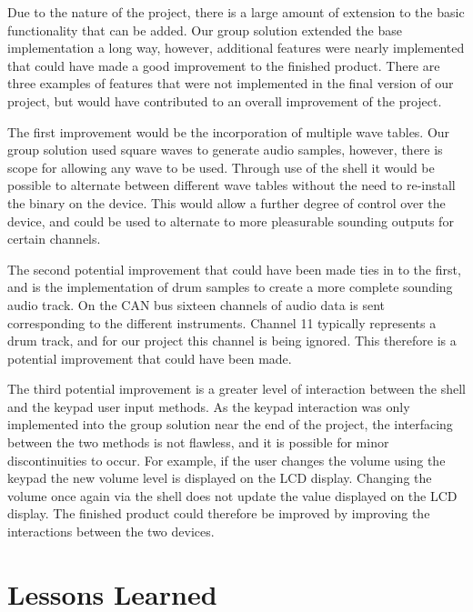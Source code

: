 Due to the nature of the project, there is a large amount of extension to the 
basic functionality that can be added. Our group solution extended the base 
implementation a long way, however, additional features were nearly implemented
that could have made a good improvement to the finished product. 
There are three examples of features that were not implemented in the final 
version of our project, but would have contributed to an overall improvement of 
the project. 
\par\bigskip\noindent
The first improvement would be the incorporation of multiple wave 
tables. 
Our group solution used square waves to generate audio samples, however, 
there is scope for allowing any wave to be used. 
Through use of the shell it would be possible to alternate between different 
wave tables without the need to re-install the binary on the device. This would 
allow a further degree of control over the device, and could be used to alternate
to more pleasurable sounding outputs for certain channels. 
\par\bigskip\noindent
The second potential improvement that could have been made ties in to the first, 
and is the implementation of drum samples to create a more complete sounding 
audio track. On the CAN bus sixteen channels of audio data is sent corresponding 
to the different instruments. Channel 11 typically represents a drum track, and 
for our project this channel is being ignored. This therefore is a potential
improvement that could have been made. 
\par\bigskip\noindent
The third potential improvement is a greater level of interaction between the 
shell and the keypad user input methods. As the keypad interaction was only 
implemented into the group solution near the end of the project, the interfacing 
between the two methods is not flawless, and it is possible for minor 
discontinuities to occur. For example, if the user changes the volume using the 
keypad the new volume level is displayed on the LCD display. Changing the 
volume once again via the shell does not update the value displayed on the LCD 
display. The finished product could therefore be improved by improving the 
interactions between the two devices. 

\section{Lessons Learned}

